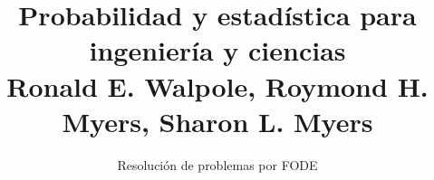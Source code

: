 \normalfont

\author{\Large Resolución de problemas por FODE}
\title{Probabilidad y estadística para ingeniería y ciencias\\ \small Ronald E. Walpole, Roymond H. Myers, Sharon L. Myers}
\date{}
\pagestyle{empty}
\maketitle
\thispagestyle{empty}
\let\cleardoublepage\clearpage
\tableofcontents								%


 
\let\cleardoublepage\clearpage